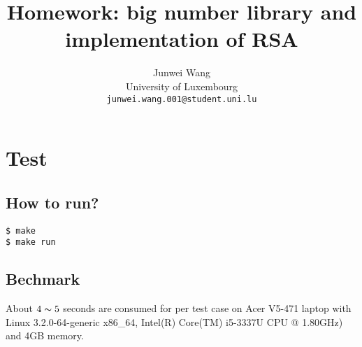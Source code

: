 \documentclass{article}
\title{\textbf{\Large Homework: big number library and implementation of RSA}}
\author{Junwei Wang\\
\small University of Luxembourg\\
\small \texttt{junwei.wang.001@student.uni.lu} \\
}
\begin{document}
\maketitle
\renewcommand{\algorithmicrequire}{\textbf{Input:}}
\renewcommand{\algorithmicensure}{\textbf{Output:}}





\section{Test}
\subsection{How to run?}
\texttt{\$ make} 
\\\texttt{\$ make run}
\subsection{Bechmark}
About $4\thicksim5$ seconds are consumed for per test case on Acer V5-471 laptop
with Linux 3.2.0-64-generic x86\_64, Intel(R) Core(TM) i5-3337U CPU @ 1.80GHz)
and 4GB memory.





%
\end{document}
